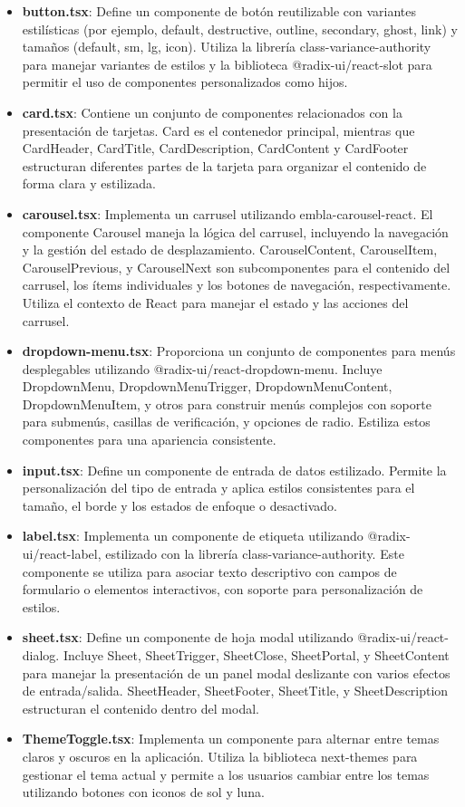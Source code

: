 \begin{itemize}
    \item \textbf{button.tsx}: Define un componente de botón reutilizable con variantes estilísticas (por ejemplo, default, destructive, outline, secondary, ghost, link) y tamaños (default, sm, lg, icon). Utiliza la librería class-variance-authority para manejar variantes de estilos y la biblioteca @radix-ui/react-slot para permitir el uso de componentes personalizados como hijos.
    \item \textbf{card.tsx}: Contiene un conjunto de componentes relacionados con la presentación de tarjetas. Card es el contenedor principal, mientras que CardHeader, CardTitle, CardDescription, CardContent y CardFooter estructuran diferentes partes de la tarjeta para organizar el contenido de forma clara y estilizada.
    \item \textbf{carousel.tsx}: Implementa un carrusel utilizando embla-carousel-react. El componente Carousel maneja la lógica del carrusel, incluyendo la navegación y la gestión del estado de desplazamiento. CarouselContent, CarouselItem, CarouselPrevious, y CarouselNext son subcomponentes para el contenido del carrusel, los ítems individuales y los botones de navegación, respectivamente. Utiliza el contexto de React para manejar el estado y las acciones del carrusel.
    \item \textbf{dropdown-menu.tsx}: Proporciona un conjunto de componentes para menús desplegables utilizando @radix-ui/react-dropdown-menu. Incluye DropdownMenu, DropdownMenuTrigger, DropdownMenuContent, DropdownMenuItem, y otros para construir menús complejos con soporte para submenús, casillas de verificación, y opciones de radio. Estiliza estos componentes para una apariencia consistente.
    \item \textbf{input.tsx}: Define un componente de entrada de datos estilizado. Permite la personalización del tipo de entrada y aplica estilos consistentes para el tamaño, el borde y los estados de enfoque o desactivado.
    \item \textbf{label.tsx}: Implementa un componente de etiqueta utilizando @radix-ui/react-label, estilizado con la librería class-variance-authority. Este componente se utiliza para asociar texto descriptivo con campos de formulario o elementos interactivos, con soporte para personalización de estilos.
    \item \textbf{sheet.tsx}: Define un componente de hoja modal utilizando @radix-ui/react-dialog. Incluye Sheet, SheetTrigger, SheetClose, SheetPortal, y SheetContent para manejar la presentación de un panel modal deslizante con varios efectos de entrada/salida. SheetHeader, SheetFooter, SheetTitle, y SheetDescription estructuran el contenido dentro del modal.
    \item \textbf{ThemeToggle.tsx}: Implementa un componente para alternar entre temas claros y oscuros en la aplicación. Utiliza la biblioteca next-themes para gestionar el tema actual y permite a los usuarios cambiar entre los temas utilizando botones con iconos de sol y luna.
\end{itemize}

